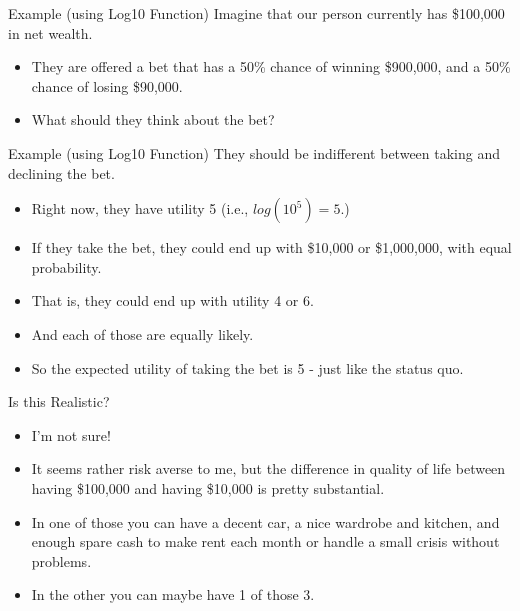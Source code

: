 \documentclass[
  ignorenonframetext,
]{beamer}
\providecommand{\tightlist}{%
  \setlength{\itemsep}{0pt}\setlength{\parskip}{0pt}}
\renewcommand{\,}{\text{, }}
\begin{document}
\begin{frame}{Example (using Log10 Function)}
\protect\hypertarget{example-using-log10-function}{}
Imagine that our person currently has \$100,000 in net wealth. \pause

\begin{itemize}
\tightlist
\item
  They are offered a bet that has a 50\% chance of winning \$900,000,
  and a 50\% chance of losing \$90,000.
\item
  What should they think about the bet?
\end{itemize}
\end{frame}

\begin{frame}{Example (using Log10 Function)}
\protect\hypertarget{example-using-log10-function-1}{}
They should be indifferent between taking and declining the bet.

\begin{itemize}
\tightlist
\item
  Right now, they have utility 5 (i.e., \(log(10^5) = 5\).) \pause
\item
  If they take the bet, they could end up with \$10,000 or \$1,000,000,
  with equal probability.
\item
  That is, they could end up with utility 4 or 6.
\item
  And each of those are equally likely.
\item
  So the expected utility of taking the bet is 5 - just like the status
  quo.
\end{itemize}
\end{frame}

\begin{frame}{Is this Realistic?}
\protect\hypertarget{is-this-realistic}{}
\begin{itemize}
\tightlist
\item
  I'm not sure!
\item
  It seems rather risk averse to me, but the difference in quality of
  life between having \$100,000 and having \$10,000 is pretty
  substantial.
\item
  In one of those you can have a decent car, a nice wardrobe and
  kitchen, and enough spare cash to make rent each month or handle a
  small crisis without problems.
\item
  In the other you can maybe have 1 of those 3.
\end{itemize}
\end{frame}
\end{document}
